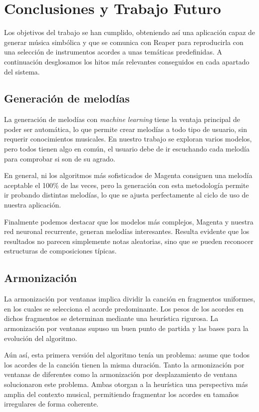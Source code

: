 \chapter{Conclusiones y Trabajo Futuro}
\label{cap:conclusiones}

Los objetivos del trabajo se han cumplido, obteniendo así una aplicación capaz de generar música simbólica y que se comunica con Reaper para reproducirla con una selección de instrumentos acordes a unas temáticas predefinidas. A continuación desglosamos los hitos más relevantes conseguidos en cada apartado del sistema.

\section{Generación de melodías}
La generación de melodías con \textit{machine learning} tiene la ventaja principal de poder ser automática, lo que permite crear melodías a todo tipo de usuario, sin requerir conocimientos musicales. En nuestro trabajo se exploran varios modelos, pero todos tienen algo en común, el usuario debe de ir escuchando cada melodía para comprobar si son de su agrado.

En general, ni los algoritmos más sofisticados de Magenta consiguen una melodía aceptable el 100\% de las veces, pero la generación con esta metodología permite ir probando distintas melodías, lo que se ajusta perfectamente al ciclo de uso de nuestra aplicación.

Finalmente podemos destacar que los modelos más complejos, Magenta y nuestra red neuronal recurrente, generan melodías interesantes. Resulta evidente que los resultados no parecen simplemente notas aleatorias, sino que se pueden reconocer estructuras de composiciones típicas. 

\section{Armonización}

La armonización por ventanas implica dividir la canción en fragmentos uniformes, en los cuales se selecciona el acorde predominante. Los pesos de los acordes en dichos fragmentos se determinan mediante una heurística rigurosa. La armonización por ventanas supuso un buen punto de partida y las bases para la evolución del algoritmo.

Aún así, esta primera versión del algoritmo tenía un problema: asume que todos los acordes de la canción tienen la misma duración. Tanto la armonización por ventanas de diferentes como la armonización por desplazamiento de ventana solucionaron este problema. Ambas otorgan a la heurística una perspectiva más amplia del contexto musical, permitiendo fragmentar los acordes en tamaños irregulares de forma coherente. 

